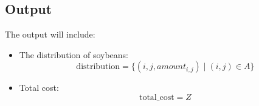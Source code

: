 \documentclass{article}
\begin{document}
\subsection*{Output}
The output will include:
\begin{itemize}
    \item The distribution of soybeans:
    \[
    \text{distribution} = \{(i,j, amount_{i,j}) \mid (i,j) \in A\}
    \]
    
    \item Total cost:
    \[
    \text{total\_cost} = Z
    \]
\end{itemize}
\end{document}
